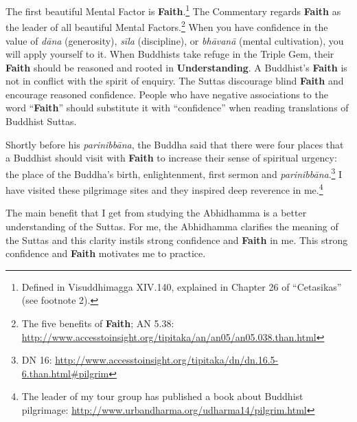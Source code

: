 The first beautiful Mental Factor is \textbf{Faith}.\footnote{Defined in Visuddhimagga XIV.140, explained in Chapter 26 of “Cetasikas” (see footnote 2).} The Commentary regards \textbf{Faith} as the leader of all beautiful Mental Factors.\footnote{The five benefits of \textbf{Faith}; AN 5.38: \url{http://www.accesstoinsight.org/tipitaka/an/an05/an05.038.than.html}} When you have confidence in the value of \textit{dāna} (generosity), \textit{sīla} (discipline), or \textit{bhāvanā} (mental cultivation), you will apply yourself to it. When Buddhists take refuge in the Triple Gem, their \textbf{Faith} should be reasoned and rooted in \textbf{Understanding}. A Buddhist’s \textbf{Faith} is not in conflict with the spirit of enquiry. The Suttas discourage blind \textbf{Faith} and encourage reasoned confidence. People who have negative associations to the word “\textbf{Faith}” should substitute it with “confidence” when reading translations of Buddhist Suttas.

Shortly before his \textit{parinibbāna}, the Buddha said that there were four places that a Buddhist should visit with \textbf{Faith} to increase their sense of spiritual urgency: the place of the Buddha’s birth, enlightenment, first sermon and \textit{parinibbāna}.\footnote{DN 16: \url{http://www.accesstoinsight.org/tipitaka/dn/dn.16.5-6.than.html\#pilgrim}} I have visited these pilgrimage sites and they inspired deep reverence in me.\footnote{The leader of my tour group has published a book about Buddhist pilgrimage: \url{http://www.urbandharma.org/udharma14/pilgrim.html}}

The main benefit that I get from studying the Abhidhamma is a better understanding of the Suttas. For me, the Abhidhamma clarifies the meaning of the Suttas and this clarity instils strong confidence and \textbf{Faith} in me. This strong confidence and \textbf{Faith} motivates me to practice.

